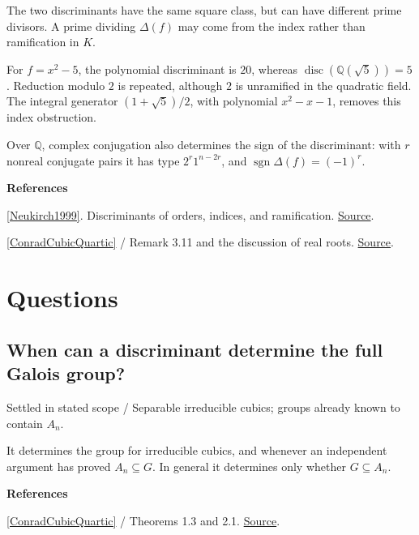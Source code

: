 \documentclass[11pt,a4paper,oneside,openany]{book}
\newcommand{\atlasdisplay}[1]{\par\begingroup\centering\vspace{3pt}\noindent\adjustbox{max width=\linewidth}{\(\displaystyle #1\)}\par\vspace{5pt}\endgroup}
\newenvironment{sources}{\par\smallskip\begingroup\footnotesize\color{atlasgray}\leftskip=10pt\setlength{\parskip}{2pt}}{\par\endgroup\smallskip}
\begin{document}
\atlasdisplay{\Delta(f)=\operatorname{disc}(K)\,[\mathcal O_K:\mathbb Z[\alpha]]^2.}
\color{black} The two discriminants have the same square class, but can have different prime divisors. A prime dividing \(\Delta(f)\) may come from the index rather than ramification in \(K\).\par
\color{black} For \(f=x^2-5\), the polynomial discriminant is \(20\), whereas \(\operatorname{disc}(\mathbb Q(\sqrt5))=5\). Reduction modulo \(2\) is repeated, although \(2\) is unramified in the quadratic field. The integral generator \((1+\sqrt5)/2\), with polynomial \(x^2-x-1\), removes this index obstruction.\par
\color{black} Over \(\mathbb Q\), complex conjugation also determines the sign of the discriminant: with \(r\) nonreal conjugate pairs it has type \(2^r1^{n-2r}\), and \(\operatorname{sgn}\Delta(f)=(-1)^r\).\par
\begin{sources}
\textbf{References}\par\smallskip
\noindent\hyperlink{ref:Neukirch1999}{[Neukirch1999]}. Discriminants of orders, indices, and ramification. \href{https://link.springer.com/book/10.1007/978-3-662-03983-0}{Source}.\par
\noindent\hyperlink{ref:ConradCubicQuartic}{[ConradCubicQuartic]} / Remark 3.11 and the discussion of real roots.  \href{https://kconrad.math.uconn.edu/blurbs/galoistheory/cubicquartic.pdf}{Source}.\par
\end{sources}\color{black}
\section*{Questions}
\subsection*{When can a discriminant determine the full Galois group?}
{\small\sffamily\color{atlasgold}Settled in stated scope / Separable irreducible cubics; groups already known to contain \(A_n\).}\par\smallskip
\color{black} It determines the group for irreducible cubics, and whenever an independent argument has proved \(A_n\subseteq G\). In general it determines only whether \(G\subseteq A_n\).\par
\begin{sources}
\textbf{References}\par\smallskip
\noindent\hyperlink{ref:ConradCubicQuartic}{[ConradCubicQuartic]} / Theorems 1.3 and 2.1.  \href{https://kconrad.math.uconn.edu/blurbs/galoistheory/cubicquartic.pdf}{Source}.\par
\end{sources}\color{black}
\end{document}

